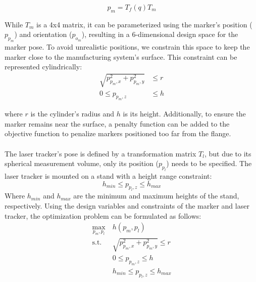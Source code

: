\documentclass{svproc}
\begin{document}
\begin{equation}
    p_m = T_{f}(q)T_{m}
\end{equation}

While $T_{m}$ is a 4x4 matrix, it can be parameterized using the marker's position ($p_{p_m}$) and orientation ($p_{o_m}$), resulting in a 6-dimensional design space for the marker pose.
To avoid unrealistic positions, we constrain this space to keep the marker close to the manufacturing system's surface.
This constraint can be represented cylindrically:
\begin{equation}
    \begin{split}
        \sqrt{p_{p_m,x}^2 + p_{p_m,y}^2} &\leq r \\
        0 \leq p_{p_m,z} &\leq h
    \end{split}
\end{equation}

where $r$ is the cylinder's radius and $h$ is its height.
Additionally, to ensure the marker remains near the surface, a penalty function can be added to the objective function to penalize markers positioned too far from the flange.\\
\\
The laser tracker's pose is defined by a transformation matrix $T_{l}$, but due to its spherical measurement volume, only its position ($p_{p_l}$) needs to be specified.
The laser tracker is mounted on a stand with a height range constraint:
\begin{equation}
    h_{min} \leq p_{p_l,z} \leq h_{max}
\end{equation}
Where $h_{min}$ and $h_{max}$ are the minimum and maximum heights of the stand, respectively.
Using the design variables and constraints of the marker and laser tracker, the optimization problem can be formulated as follows:
\begin{equation}
    \begin{split}
        \max_{p_m,p_l} & \ h(p_m,p_l) \\
        \text{s.t.} & \ \sqrt{p_{p_m,x}^2 + p_{p_m,y}^2} \leq r \\
        & \ 0 \leq p_{p_m,z} \leq h \\
        & \ h_{min} \leq p_{p_l,z} \leq h_{max} \\
    \end{split}
\end{equation}
\end{document}
